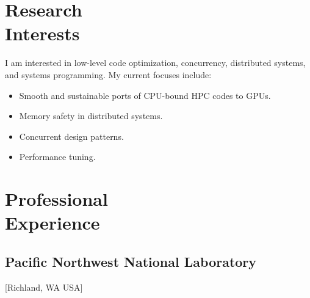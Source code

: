 \documentclass{mycv}
\begin{document}
\maketitle

\section{Research \\ Interests}

I am interested in low-level code optimization, concurrency, distributed systems, and systems programming.
My current focuses include:

\begin{itemize}
  \item Smooth and sustainable ports of CPU-bound HPC codes to GPUs.
  \item Memory safety in distributed systems.
  \item Concurrent design patterns.
  \item Performance tuning.
\end{itemize}

\section{Professional \\ Experience}

\subsection{Pacific Northwest National Laboratory}[Richland, WA USA]
\begin{positions}
\end{positions}
\end{document}
